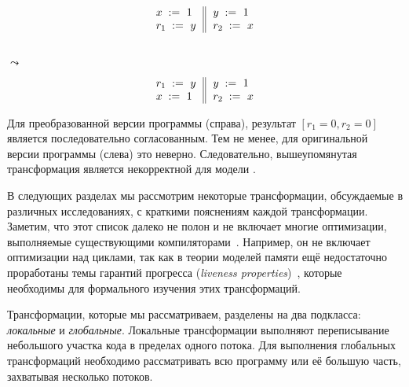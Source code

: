 \begin{minipage}{0.45\linewidth}
\begin{equation*}
\inarrII{
   \writeInst{}{x}{1}   \\
   \readInst{}{r_1}{y}  \\
}{
  \writeInst{}{y}{1}   \\
  \readInst{}{r_2}{x}  \\
}
\end{equation*}
\end{minipage}\hfill%
\begin{minipage}{0.05\linewidth}
\Large~\\ $\leadsto$
\end{minipage}\hfill%
\begin{minipage}{0.45\linewidth}
\begin{equation*}
\inarrII{
   \readInst{}{r_1}{y}  \\
   \writeInst{}{x}{1}   \\
}{
  \writeInst{}{y}{1}   \\
  \readInst{}{r_2}{x}  \\
}
\end{equation*}
\end{minipage}

Для преобразованной версии программы (справа),
результат $[r_1=0, r_2=0]$ является последовательно согласованным. 
Тем не менее, для оригинальной версии программы (слева) это неверно. 
Следовательно, вышеупомянутая трансформация 
является некорректной для модели \SC. 

В следующих разделах мы рассмотрим  некоторые  трансформации,
обсуждаемые в различных исследованиях, 
с краткими пояснениям каждой трансформации. 
Заметим, что этот список далеко не полон 
и не включает многие оптимизации, 
выполняемые существующими компиляторами~\cite{Muchnick:ACDI97}.
Например, он не включает оптимизации над циклами,
так как в теории моделей памяти ещё недостаточно 
проработаны темы гарантий прогресса 
(\emph{liveness properties})~\cite{Lahav-al:arXiv20}, 
которые необходимы для формального 
изучения этих трансформаций. 

Трансформации, которые мы рассматриваем,  
разделены на два подкласса: \emph{локальные} и \emph{глобальные}.
Локальные трансформации выполняют переписывание 
небольшого участка кода в пределах одного потока. 
Для выполнения глобальных трансформаций 
необходимо рассматривать всю программу 
или её большую часть, 
захватывая несколько потоков.      
 
